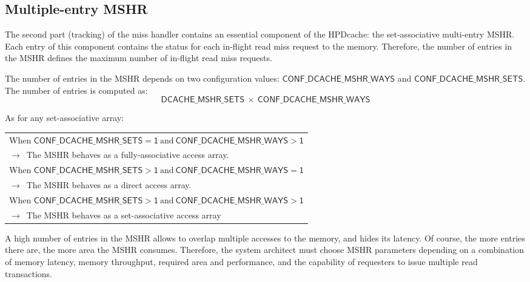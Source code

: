 \documentclass[10pt,titlepage,twoside]{book}
\begin{document}


\subsection{Multiple-entry \acf*{MSHR}}

The second part (tracking) of the miss handler contains an essential component of the \ac{HPDcache}: the set-associative multi-entry \ac{MSHR}.
Each entry of this component contains the status for each in-flight read miss request to the memory.
Therefore, the number of entries in the \ac{MSHR} defines the maximum number of in-flight read miss requests.

The number of entries in the \ac{MSHR} depends on two configuration values: $\mathsf{CONF\_DCACHE\_MSHR\_WAYS}$ and $\mathsf{CONF\_DCACHE\_MSHR\_SETS}$.
The number of entries is computed as:
\begin{equation*}
\mathsf{DCACHE\_MSHR\_SETS~\times~CONF\_DCACHE\_MSHR\_WAYS}
\end{equation*}

As for any set-associative array:

\begin{tabular}{p{\linewidth}}
    \toprule
    When $\mathsf{CONF\_DCACHE\_MSHR\_SETS = 1}~\text{and}~\mathsf{CONF\_DCACHE\_MSHR\_WAYS > 1}$\\
    $\rightarrow$~The \ac{MSHR} behaves as a fully-associative access array.\\
    \midrule
    When $\mathsf{CONF\_DCACHE\_MSHR\_SETS > 1}~\text{and}~\mathsf{CONF\_DCACHE\_MSHR\_WAYS = 1}$\\
    $\rightarrow$~The \ac{MSHR} behaves as a direct access array.\\
    \midrule
    When $\mathsf{CONF\_DCACHE\_MSHR\_SETS > 1}~\text{and}~\mathsf{CONF\_DCACHE\_MSHR\_WAYS > 1}$\\
    $\rightarrow$~The \ac{MSHR} behaves as a set-associative access array\\
\end{tabular}

A high number of entries in the \ac{MSHR} allows to overlap multiple accesses to the memory, and hides its latency.
Of course, the more entries there are, the more area the \ac{MSHR} consumes.
Therefore, the system architect must choose \ac{MSHR} parameters depending on a combination of memory latency, memory throughput, required area and performance, and the capability of requesters to issue multiple read transactions.
\end{document}
